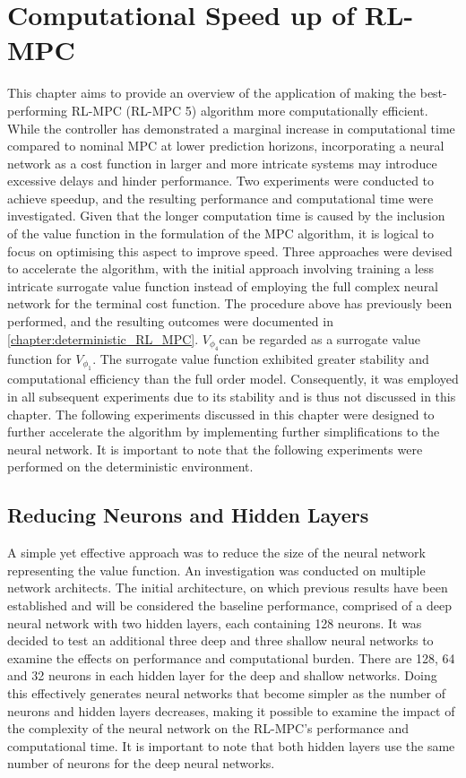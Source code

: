 \chapter{Computational Speed up of RL-MPC}
\label{chapter:speed-up}

This chapter aims to provide an overview of the application of making the best-performing RL-MPC (RL-MPC 5) algorithm more computationally efficient. While the controller has demonstrated a marginal increase in computational time compared to nominal MPC at lower prediction horizons, incorporating a neural network as a cost function in larger and more intricate systems may introduce excessive delays and hinder performance. Two experiments were conducted to achieve speedup, and the resulting performance and computational time were investigated. Given that the longer computation time is caused by the inclusion of the value function in the formulation of the MPC algorithm, it is logical to focus on optimising this aspect to improve speed. Three approaches were devised to accelerate the algorithm, with the initial approach involving training a less intricate surrogate value function instead of employing the full complex neural network for the terminal cost function. The procedure above has previously been performed, and the resulting outcomes were documented in \autoref{chapter:deterministic_RL_MPC}. ${V}_{\phi_4}$can be regarded as a surrogate value function for ${V}_{\phi_1}$. The surrogate value function exhibited greater stability and computational efficiency than the full order model. Consequently, it was employed in all subsequent experiments due to its stability and is thus not discussed in this chapter. The following experiments discussed in this chapter were designed to further accelerate the algorithm by implementing further simplifications to the neural network. It is important to note that the following experiments were performed on the deterministic environment.

\section{Reducing Neurons and Hidden Layers}
A simple yet effective approach was to reduce the size of the neural network representing the value function. An investigation was conducted on multiple network architects. The initial architecture, on which previous results have been established and will be considered the baseline performance, comprised of a deep neural network with two hidden layers, each containing 128 neurons. It was decided to test an additional three deep and three shallow neural networks to examine the effects on performance and computational burden. There are 128, 64 and 32 neurons in each hidden layer for the deep and shallow networks. Doing this effectively generates neural networks that become simpler as the number of neurons and hidden layers decreases, making it possible to examine the impact of the complexity of the neural network on the RL-MPC’s performance and computational time. It is important to note that both hidden layers use the same number of neurons for the deep neural networks.


